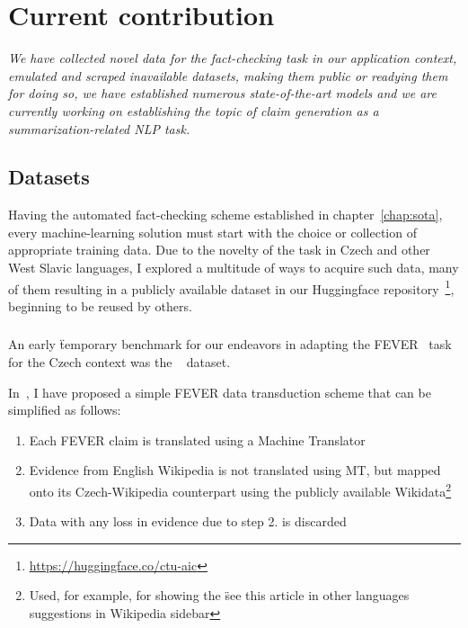 
\chapter{Current contribution}
\label{chap:contribution}

\textit{We have collected novel data for the fact-checking task in our application context, emulated and scraped inavailable datasets, making them public or readying them for doing so, we have established numerous state-of-the-art models and we are currently working on establishing the topic of claim generation as a summarization-related NLP task.}

\section{Datasets}
Having the automated fact-checking scheme established in chapter~\ref{chap:sota}, every machine-learning solution must start with the choice or collection of appropriate training data.
Due to the novelty of the task in Czech and other West Slavic languages, I explored a multitude of ways to acquire such data, many of them resulting in a publicly available dataset in our Huggingface repository~\footnote{\url{https://huggingface.co/ctu-aic}}, beginning to be reused by others. 

\subsection{\FCZ}\label{sec:fcz}
An early \"{temporary benchmark} for our endeavors in adapting the FEVER~\cite{fever} task for the Czech context was the \FCZ~\cite{lrev} dataset.

In~\cite{diplomka}, I have proposed a simple FEVER data transduction scheme that can be simplified as follows:

\begin{enumerate}
    \item Each FEVER claim is translated using a Machine Translator
    \item Evidence from English Wikipedia is not translated using MT, but mapped onto its Czech-Wikipedia counterpart using the publicly available Wikidata\footnote{Used, for example, for showing the \"{see this article in other languages} suggestions in Wikipedia sidebar}
    \item Data with any loss in evidence due to step 2. is discarded
\end{enumerate}

